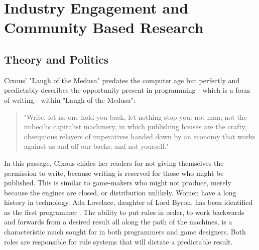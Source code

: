 \chapter{Industry Engagement and Community Based Research}\thispagestyle{empty} %
\label{Chapter3} %


\section{Theory and Politics}
Cixous' "Laugh of the Medusa" predates the computer age but perfectly and predictably describes the opportunity present in programming - which is a form of writing - within "Laugh of the Medusa":
\begin{quote}
"Write, let no one hold you back, let nothing stop you: not man; not the imbecilic capitalist machinery, in which publishing houses are the crafty, obsequious relayers of imperatives handed down by an economy that works against us and off our backs; and not yourself." 
\textit{\parencite{cixous}}
\end{quote}

In this passage, Cixous chides her readers for not giving themselves the permission to write, because writing is reserved for those who might be published. This is similar to game-makers who might not produce, merely because the engines are closed, or distribution unlikely. Women have a long history in technology.
Ada Lovelace, daughter of Lord Byron, has been identified as the first programmer \parencite{plant}. The ability to put rules in order, to work backwards and forwards from a desired result all along the path of the machines, is a characteristic much sought for in both programmers and game designers. Both roles are responsible for rule systems that will dictate a predictable result.

